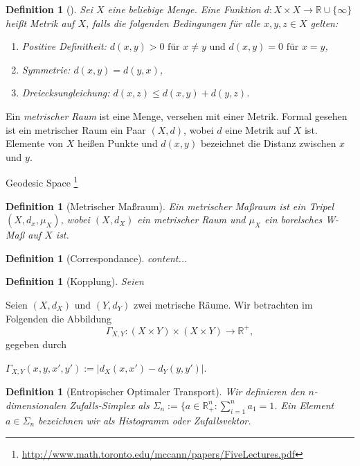 \documentclass[11pt,a4paper]{article}
\def\emph#1{\textit{#1}}
\newtheorem{definition}[theorem]{Definition}
\numberwithin{equation}{section}
\begin{document}
	
	
	\begin{definition}[\cite{burago2001course}]
		Sei $X$ eine beliebige Menge. Eine Funktion $d:X \times X \to \mathbb{R} \cup \lbrace \infty \rbrace$ heißt \emph{Metrik} auf $X$, falls die folgenden Bedingungen für alle $x,y,z \in X$ gelten:
		\begin{enumerate}[label={(\arabic*)}]
			\item Positive Definitheit: $d(x,y) > 0 \text{ für } x \neq y \text{ und } d(x,y)=0 \text{ für } x=y$,
			\item Symmetrie: $d(x,y)=d(y,x)$,
			\item Dreiecksungleichung: $d(x,z) \leq d(x,y) + d(y,z)$.	
		\end{enumerate}
	\end{definition}
	Ein \emph{metrischer Raum} ist eine Menge, versehen mit einer Metrik. Formal gesehen ist ein metrischer Raum ein Paar $(X,d)$, wobei $d$ eine Metrik auf $X$ ist. Elemente von $X$ heißen Punkte und $d(x,y)$ bezeichnet die Distanz zwischen $x$ und $y$.
	
	
	
	
	
	Geodesic Space \footnote{\url{http://www.math.toronto.edu/mccann/papers/FiveLectures.pdf}}
	
	
	
	
	\begin{definition}[Metrischer Maßraum]
		Ein \emph{metrischer Maßraum} ist ein Tripel $(X,d_x,\mu_X)$, wobei $(X,d_X)$ ein metrischer Raum und $\mu_X$ ein borelsches W-Maß auf $X$ ist.
	\end{definition}
	
	\begin{definition}[Correspondance]
		content...
	\end{definition}
	
	\begin{definition}[Kopplung]
		Seien 
	\end{definition}
	
	Seien $(X,d_X)$ und $(Y,d_Y)$ zwei metrische Räume. Wir betrachten im Folgenden die Abbildung
	\begin{equation}
	\Gamma_{X,Y}: (X\times Y) \times (X \times Y) \to \mathbb{R^{+}},
	\end{equation}
	gegeben durch
	
	$\Gamma_{X,Y}(x,y,x',y'):= |d_X(x,x') - d_Y(y,y')|$.
	
	
	\begin{definition}[Entropischer Optimaler Transport]
		Wir definieren den $n$-dimensionalen Zufalls-Simplex als $\Sigma_n := \lbrace a \in \mathbb{R}_+^n: \sum_{i=1}^{n}{a_1} = 1$. Ein Element $a \in \Sigma_n$ bezeichnen wir als Histogramm oder Zufallsvektor.
		
	\end{definition}
	
\end{document}
